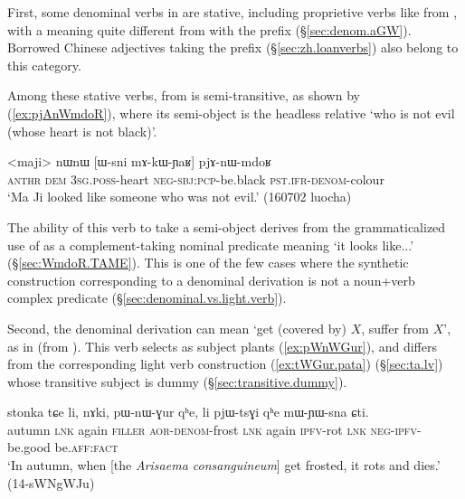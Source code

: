 First, some denominal verbs in  are stative, including proprietive verbs like   from , with a meaning quite different from  with the  prefix (§\ref{sec:denom.aGW}).  Borrowed Chinese adjectives taking the  prefix (§\ref{sec:zh.loanverbs}) also belong to this category.
 
Among these stative verbs,   from   is semi-transitive, as shown by (\ref{ex:pjAnWmdoR}), where its semi-object is the headless relative  `who is not evil (whose heart is not black)'.  
  
\begin{exe}
\ex \label{ex:pjAnWmdoR}
 \gll <maji> nɯnɯ [ɯ-sni mɤ-kɯ-ɲaʁ] pjɤ-nɯ-mdoʁ  \\
  \textsc{anthr} \textsc{dem} \textsc{3sg}.\textsc{poss}-heart \textsc{neg}-\textsc{sbj}:\textsc{pcp}-be.black \textsc{pst}.\textsc{ifr}-\textsc{denom}-colour \\
 \glt `Ma Ji looked like someone who was not evil.' (160702 luocha) 
\end{exe}

The ability of this verb to take a semi-object derives from the grammaticalized use of  as a com\-ple\-ment-taking nominal predicate meaning `it looks like...' (§\ref{sec:WmdoR.TAME}). This is one of the few cases where the synthetic construction corresponding to a denominal derivation is not a noun+verb complex predicate (§\ref{sec:denominal.vs.light.verb}).

 
 
Second, the  denominal derivation can mean `get (covered by) $X$, suffer from $X$', as in  (from ). This verb selects as subject plants (\ref{ex:pWnWGur}), and differs from the corresponding light verb construction  (\ref{ex:tWGur.pata}) (§\ref{sec:ta.lv}) whose transitive subject is dummy (§\ref{sec:transitive.dummy}).
 
 
 \begin{exe}
\ex \label{ex:pWnWGur}
 \gll stonka tɕe li, nɤki, pɯ-nɯ-ɣur qʰe, li pjɯ-tsɣi qʰe mɯ-ɲɯ-sna ɕti. \\
autumn \textsc{lnk} again \textsc{filler} \textsc{aor}-\textsc{denom}-frost \textsc{lnk} again \textsc{ipfv}-rot \textsc{lnk} \textsc{neg}-\textsc{ipfv}-be.good be.\textsc{aff}:\textsc{fact} \\
\glt `In autumn, when [the \textit{Arisaema consanguineum}] get frosted, it rots and dies.' (14-sWNgWJu)
\end{exe}

